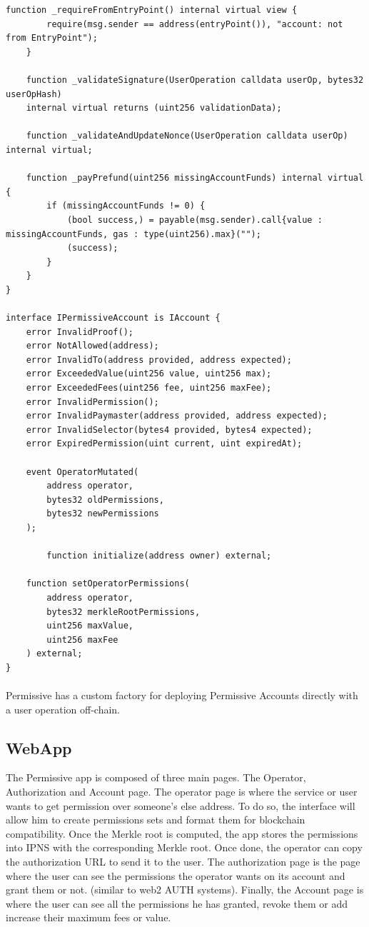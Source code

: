 \documentclass{article}
\begin{document}
\begin{lstlisting}[language=Solidity]
    function _requireFromEntryPoint() internal virtual view {
        require(msg.sender == address(entryPoint()), "account: not from EntryPoint");
    }

    function _validateSignature(UserOperation calldata userOp, bytes32 userOpHash)
    internal virtual returns (uint256 validationData);

    function _validateAndUpdateNonce(UserOperation calldata userOp) internal virtual;

    function _payPrefund(uint256 missingAccountFunds) internal virtual {
        if (missingAccountFunds != 0) {
            (bool success,) = payable(msg.sender).call{value : missingAccountFunds, gas : type(uint256).max}("");
            (success);
        }
    }
}

interface IPermissiveAccount is IAccount {
    error InvalidProof();
    error NotAllowed(address);
    error InvalidTo(address provided, address expected);
    error ExceededValue(uint256 value, uint256 max);
    error ExceededFees(uint256 fee, uint256 maxFee);
    error InvalidPermission();
    error InvalidPaymaster(address provided, address expected);
    error InvalidSelector(bytes4 provided, bytes4 expected);
    error ExpiredPermission(uint current, uint expiredAt);

    event OperatorMutated(
        address operator,
        bytes32 oldPermissions,
        bytes32 newPermissions
    );

		function initialize(address owner) external;

    function setOperatorPermissions(
        address operator,
        bytes32 merkleRootPermissions,
        uint256 maxValue,
        uint256 maxFee
    ) external;
}
\end{lstlisting}
\paragraph{}
Permissive has a custom factory for deploying Permissive Accounts directly with a user operation off-chain.
\subsection{WebApp}
The Permissive app is composed of three main pages. The Operator, Authorization and Account page. The operator page is where the service or user wants to get permission over someone’s else address. To do so, the interface will allow him to create permissions sets and format them for blockchain compatibility. Once the Merkle root is computed, the app stores the permissions into IPNS with the corresponding Merkle root. Once done, the operator can copy the authorization URL to send it to the user.  The authorization page is the page where the user can see the permissions the operator wants on its account and grant them or not. (similar to web2 AUTH systems). Finally, the Account page is where the user can see all the permissions he has granted, revoke them or add increase their maximum fees or value.
\end{document}
